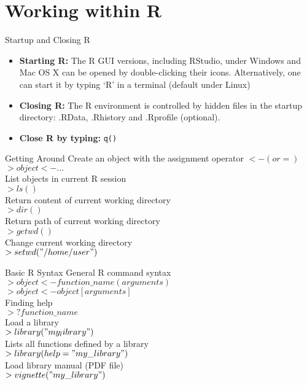 \documentclass{beamer}
\begin{document}
\section[]{Working within R}
\begin{frame}{Startup and Closing R}
\begin{itemize}
\item \textbf{Starting R:} The R GUI versions, including RStudio, under Windows and Mac OS X can be opened by double-clicking their icons. Alternatively, one can start it by typing `R' in a terminal (default under Linux)
\item \textbf{Closing R:} The R environment is controlled by hidden files in the startup directory: .RData, .Rhistory and .Rprofile (optional).
\item \textbf{Close R by typing:} \texttt{q()}
\end{itemize}
\end{frame}

\begin{frame}{Getting Around}
Create an object with the assignment operator $<- (or =)$\\ 
$> object <- ...$\\
List objects in current R session\\
$> ls()$\\
Return content of current working directory\\
$> dir()$\\
Return path of current working directory\\
$> getwd()$\\
Change current working directory\\
$> setwd("/home/user")$
\end{frame}

\begin{frame}{Basic R Syntax}
General R command syntax\\
$> object <-  function\_name(arguments)$\\
$> object <-  object[arguments]$\\
Finding help\\
$> ?function\_name$\\
Load a library\\
$> library("my_library")$\\
Lists all functions defined by a library\\
$> library(help="my\_library")$\\
Load library manual (PDF file)\\
$> vignette("my\_library")$
\end{frame}
\end{document}
